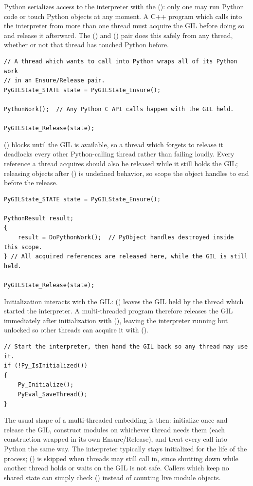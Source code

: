 Python serializes access to the interpreter with the  (): only one  may run Python code or touch Python objects at any moment. A C++ program which calls into the interpreter from more than one thread must acquire the GIL before doing so and release it afterward. The () and () pair does this safely from any thread, whether or not that thread has touched Python before.
\begin{lstlisting}
// A thread which wants to call into Python wraps all of its Python work
// in an Ensure/Release pair.
PyGILState_STATE state = PyGILState_Ensure();

PythonWork();  // Any Python C API calls happen with the GIL held.

PyGILState_Release(state);
\end{lstlisting}
() blocks until the GIL is available, so a thread which forgets to release it deadlocks every other Python-calling thread rather than failing loudly. Every reference a thread acquires should also be released while it still holds the GIL; releasing objects after () is undefined behavior, so scope the object handles to end before the release.
\begin{lstlisting}
PyGILState_STATE state = PyGILState_Ensure();

PythonResult result;
{
    result = DoPythonWork();  // PyObject handles destroyed inside this scope.
} // All acquired references are released here, while the GIL is still held.

PyGILState_Release(state);
\end{lstlisting}
Initialization interacts with the GIL: () leaves the GIL held by the thread which started the interpreter. A multi-threaded program therefore releases the GIL immediately after initialization with (), leaving the interpreter running but unlocked so other threads can acquire it with ().
\begin{lstlisting}
// Start the interpreter, then hand the GIL back so any thread may use it.
if (!Py_IsInitialized())
{
    Py_Initialize();
    PyEval_SaveThread();
}
\end{lstlisting}
The usual shape of a multi-threaded embedding is then: initialize once and release the GIL, construct modules on whichever thread needs them (each construction wrapped in its own Ensure/Release), and treat every call into Python the same way. The interpreter typically stays initialized for the life of the process; () is skipped when threads may still call in, since shutting down while another thread holds or waits on the GIL is not safe. Callers which keep no shared state can simply check () instead of counting live module objects.












